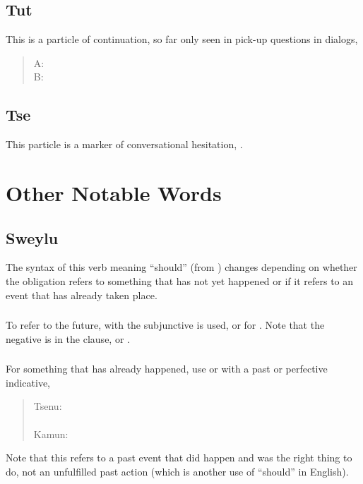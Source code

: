 \subsection{Tut} This is a particle of continuation, so far only seen
in pick-up questions in dialogs, 

\begin{quotation}
\noindent A:   \\
\noindent B:  
\end{quotation}

\subsection{Tse} This particle is a marker of conversational
hesitation, . 


\section{Other Notable Words}

\subsection{Sweylu} \label{syn:sweylu} The syntax of this verb meaning
``should'' (from  ) changes depending on
whether the obligation refers to something that has not yet happened or
if it refers to an event that has already taken place.

\subsubsection{} To refer to the future,  with the subjunctive
is used,  or  for .  Note that the negative is
in the  clause,  or  .

\subsubsection{} For something that has already happened, use 
or  with a past or perfective indicative,

\begin{quotation}
\noindent Tsenu: \\
\noindent{} \\

\noindent Kamun: \\
\noindent{}
\end{quotation}

\noindent Note that this refers to a past event that did happen and
was the right thing to do, not an unfulfilled past action (which is
another use of ``should'' in English).
